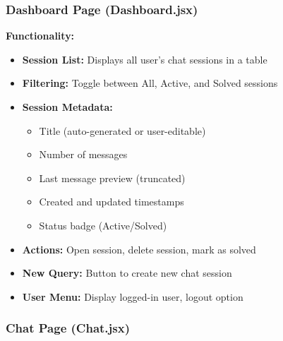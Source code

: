 \documentclass[12pt,a4paper]{article}
\begin{document}
\subsubsection{Dashboard Page (Dashboard.jsx)}

\textbf{Functionality:}
\begin{itemize}
    \item \textbf{Session List:} Displays all user's chat sessions in a table
    \item \textbf{Filtering:} Toggle between All, Active, and Solved sessions
    \item \textbf{Session Metadata:}
    \begin{itemize}
        \item Title (auto-generated or user-editable)
        \item Number of messages
        \item Last message preview (truncated)
        \item Created and updated timestamps
        \item Status badge (Active/Solved)
    \end{itemize}
    \item \textbf{Actions:} Open session, delete session, mark as solved
    \item \textbf{New Query:} Button to create new chat session
    \item \textbf{User Menu:} Display logged-in user, logout option
\end{itemize}

\subsubsection{Chat Page (Chat.jsx)}
\end{document}

